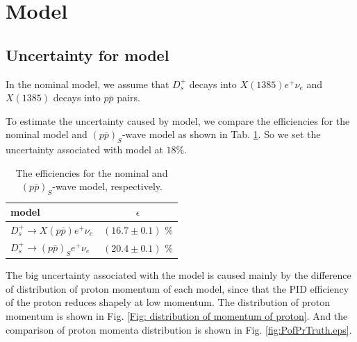 \section{Model}
\label{Sec: model}
\subsection{Uncertainty for model}

In the nominal model, we assume that $D_{s}^{+}$ decays into $X(1385)
e^{+} \nu_{e}$ and $X(1385)$ decays into $p\bar{p}$ pairs.

To estimate the uncertainty caused by model, we compare the
efficiencies for the nominal model and $(p\bar{p})_{S}$-wave model as shown in Tab.
\ref{Tab: model err}. So we set the uncertainty associated with model
at $18\%$.  
\begin{table}[bthp]
    \caption{The efficiencies for the nominal and $(p\bar{p})_{S}$-wave model,
    respectively.}        
    \label{Tab: model err}
    \begin{center}
    \begin{tabular}{lc}
        \hline \hline
        model    &    $ \epsilon $     \\ \hline
        $D_{s}^{+} \rightarrow X(p\bar{p}) e^{+} \nu_{e}$ &
        $(16.7 \pm 0.1 )$ \%      \\ 
        $D_{s}^{+} \rightarrow (p \bar{p})_{S} e^{+} \nu_{e}$    &
        $(20.4 \pm 0.1 )$ \%          \\ 
        \hline \hline
    \end{tabular}
    \end{center}
\end{table}

The big uncertainty associated with the model is caused mainly by the
difference of distribution of proton momentum of each model, since that
the PID efficiency of the proton reduces shapely at low momentum. The
distribution of proton momentum is shown in Fig.  \ref{Fig:
distribution of momentum of proton}.
And the comparison of proton momenta distribution is shown in Fig. \ref{fig:PofPrTruth.eps}.

